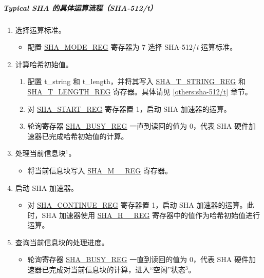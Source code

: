 \documentclass[main\_\_CN.tex]{subfiles}
\begin{document}
\subparagraph{Typical SHA 的具体运算流程（SHA-512/{\it{t}}）}

\begin{enumerate}
    \item \label{others:sha-sel-algorithm2} 选择运算标准。
    \begin{itemize}
        \item 配置 \hyperref[regdesc:SHAMODEREG]{SHA\_MODE\_REG} 寄存器为 7 选择 SHA-512/{\it{t}} 运算标准。
    \end{itemize}
    \item 计算哈希初始值。
        \begin{enumerate}
        \item 配置 t\_string 和 t\_length，并将其写入 \hyperref[regdesc:SHATSTRINGREG]{SHA\_T\_STRING\_REG} 和 \hyperref[regdesc:SHATLENGTHREG]{SHA\_T\_LENGTH\_REG} 寄存器。具体请见 \ref{others:sha-512/t} 章节。
        \item 对 \hyperref[regdesc:SHASTARTREG]{SHA\_START\_REG} 寄存器置 1，启动 SHA 加速器的运算。
        \item 轮询寄存器 \hyperref[regdesc:SHABUSYREG]{SHA\_BUSY\_REG} 一直到读回的值为 0，代表 SHA 硬件加速器已完成哈希初始值的计算。
    \end{enumerate}

    \item \label{others:sha-current-block1} 处理当前信息块\hyperref[others:sha-note-typical-sha]{$^1$}。
    \begin{itemize}
        \item 将当前信息块写入 \hyperref[regdesc:SHAMNREG]{SHA\_M\_\_REG} 寄存器。
    \end{itemize}
    \item 启动 SHA 加速器。
    \begin{itemize}
        \item 对 \hyperref[regdesc:SHACONTINUEREG]{SHA\_CONTINUE\_REG} 寄存器置 1，启动 SHA 加速器的运算。此时，SHA 加速器使用 \hyperref[regdesc:SHAHNREG]{SHA\_H\_\_REG} 寄存器中的值作为哈希初始值进行运算。
    \end{itemize}

    \item 查询当前信息块的处理进度。
    \begin{itemize}
        \item 轮询寄存器 \hyperref[regdesc:SHABUSYREG]{SHA\_BUSY\_REG} 一直到读回的值为 0，代表 SHA 硬件加速器已完成对当前信息块的计算，进入“空闲”状态\hyperref[others:sha-note-typical-sha]{$^3$}。
    \end{itemize}


\end{enumerate}
\end{document}
